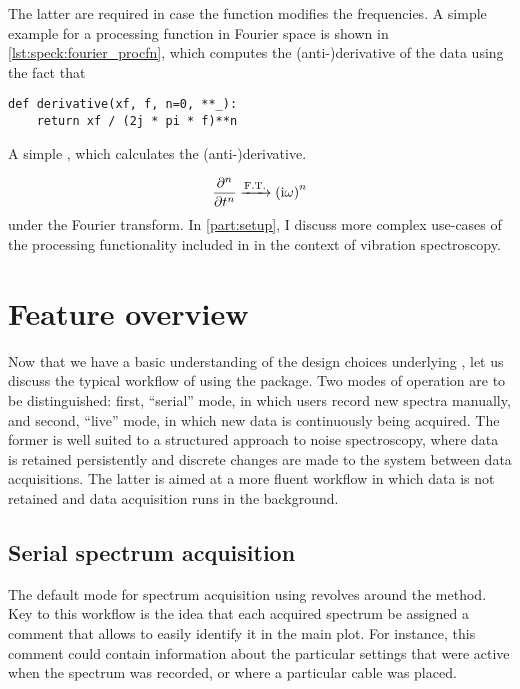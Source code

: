 The latter are required in case the function modifies the frequencies.
A simple example for a processing function in Fourier space is shown in \cref{lst:speck:fourier_procfn}, which computes the \mbox{(anti-)}derivative of the data using the fact that
\begin{marginlisting}
    \begin{verbatim}
def derivative(xf, f, n=0, **_):
    return xf / (2j * pi * f)**n
    \end{verbatim}
    \caption[Simple  example]{A simple , which calculates the \mbox{(anti-)}derivative.}
    \label{lst:speck:fourier_procfn}
\end{marginlisting}
\begin{align}\label{eq:speck:fourier_derivative}
    \pdv[n]{t} \xrightarrow{\mathrm{F.T.}} \left(\mathrm{i}\omega\right)^n
\end{align}
under the Fourier transform.
In \cref{part:setup}, I discuss more complex use-cases of the processing functionality included in \pyspeck in the context of vibration spectroscopy.

\section{Feature overview}\label{sec:speck:software:features}
Now that we have a basic understanding of the design choices underlying \pyspeck, let us discuss the typical workflow of using the package.
Two modes of operation are to be distinguished: first, \enquote{serial} mode, in which users record new spectra manually, and second, \enquote{live} mode, in which new data is continuously being acquired.
The former is well suited to a structured approach to noise spectroscopy, where data is retained persistently and discrete changes are made to the system between data acquisitions.
The latter is aimed at a more fluent workflow in which data is not retained and data acquisition runs in the background.

\subsection{Serial spectrum acquisition}\label{subsec:speck:software:features:serial}
The default mode for spectrum acquisition using \pyspeck revolves around the  method.
Key to this workflow is the idea that each acquired spectrum be assigned a comment that allows to easily identify it in the main plot.
For instance, this comment could contain information about the particular settings that were active when the spectrum was recorded, or where a particular cable was placed.

